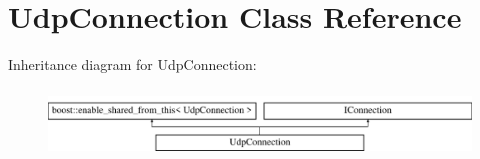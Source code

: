 \hypertarget{class_udp_connection}{\section{Udp\-Connection Class Reference}
\label{class_udp_connection}
}
Inheritance diagram for Udp\-Connection\-:\begin{figure}[H]
\begin{center}
\leavevmode
\includegraphics[height=1.818182cm]{class_udp_connection}
\end{center}
\end{figure}
